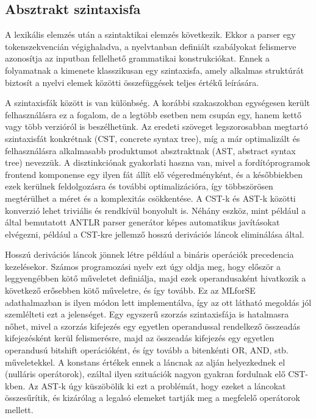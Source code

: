 \documentclass[twoside, 12pt]{report}
\begin{document}
\subsection{Absztrakt szintaxisfa}

A lexikális elemzés után a szintaktikai elemzés következik. Ekkor a parser egy tokenszekvencián végighaladva, a nyelvtanban definiált szabályokat felismerve azonosítja az inputban fellelhető grammatikai konstrukciókat. Ennek a folyamatnak a kimenete klasszikusan egy szintaxisfa, amely alkalmas struktúrát biztosít a nyelvi elemek közötti összefüggések teljes értékű leírására.

A szintaxisfák között is van különbség. A korábbi szakaszokban egységesen került felhasználásra ez a fogalom, de a legtöbb esetben nem csupán egy, hanem kettő vagy több verzióról is beszélhetünk. Az eredeti szöveget legszorosabban megtartó szintaxisfát konkrétnak (CST, concrete syntax tree), míg a már optimalizált és felhasználásra alkalmasabb produktumot absztraktnak (AST, abstract syntax tree) nevezzük. A disztinkciónak gyakorlati haszna van, mivel a fordítóprogramok frontend komponense egy ilyen fát állít elő végeredményként, és a későbbiekben ezek kerülnek feldolgozásra és további optimalizációra, így többszörösen megtérülhet a méret és a komplexitás csökkentése. A CST-k és AST-k közötti konverzió lehet triviális és rendkívül bonyolult is. Néhány eszköz, mint például a \textcite{PQ95a} által bemutatott ANTLR parser generátor képes automatikus javításokat elvégezni, például a CST-kre jellemző hosszú derivációs láncok eliminálása által.

Hosszú derivációs láncok jönnek létre például a bináris operációk precedencia kezelésekor. Számos programozási nyelv ezt úgy oldja meg, hogy először a leggyengébben kötő műveletet definiálja, majd ezek operandusaként hivatkozik a következő erősebben kötő műveletre, és így tovább. Ez az MLforSE adathalmazban is ilyen módon lett implementálva, így az ott látható megoldás jól szemlélteti ezt a jelenséget. Egy egyszerű szorzás szintaxisfája is hatalmasra nőhet, mivel a szorzás kifejezés egy egyetlen operandussal rendelkező összeadás kifejezésként kerül felismerésre, majd az összeadás kifejezés egy egyetlen operandusú bitshift operációként, és így tovább a bitenkénti OR, AND, stb. műveletekkel. A konstans értékek ennek a láncnak az alján helyezkednek el (nulláris operátorok), ezáltal ilyen szituációk nagyon gyakran fordulnak elő CST-kben. Az AST-k úgy küszöbölik ki ezt a problémát, hogy ezeket a láncokat összesűrítik, és kizárólag a legalsó elemeket tartják meg a megfelelő operátorok mellett.
\end{document}
